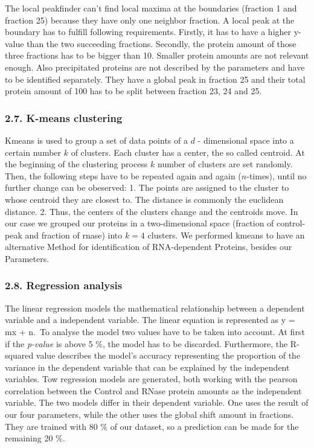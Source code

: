 \documentclass[
  12pt,
]{article}
\begin{document}
The local peakfinder can't find local maxima at the boundaries (fraction
1 and fraction 25) because they have only one neighbor fraction. A local
peak at the boundary has to fulfill following requirements. Firstly, it
has to have a higher y-value than the two succeeding fractions.
Secondly, the protein amount of those three fractions has to be bigger
than 10. Smaller protein amounts are not relevant enough. Also
precipitated proteins are not described by the parameters and have to be
identified separately. They have a global peak in fraction 25 and their
total protein amount of 100 has to be split between fraction 23, 24 and
25.

\hypertarget{k-means-clustering}{%
\subsubsection{2.7. K-means clustering}\label{k-means-clustering}}

Kmeans is used to group a set of data points of a \(d\) - dimensional
space into a certain number \(k\) of clusters. Each cluster has a
center, the so called centroid. At the beginning of the clustering
process \(k\) number of clusters are set randomly. Then, the following
steps have to be repeated again and again (\(n\)-times), until no
further change can be obeserved: 1. The points are assigned to the
cluster to whose centroid they are closest to. The distance is commonly
the euclidean distance. 2. Thus, the centers of the clusters change and
the centroids move. In our case we grouped our proteins in a
two-dimensional space (fraction of control-peak and fraction of rnase)
into \(k=4\) clusters. We performed kmeans to have an alternative Method
for identification of RNA-dependent Proteins, besides our Parameters.

\hypertarget{regression-analysis}{%
\subsubsection{2.8. Regression analysis}\label{regression-analysis}}

The linear regression models the mathematical relationship between a
dependent variable and a independent variable. The linear equation is
represented as y = mx + n.~To analyse the model two values have to be
taken into account. At first if the \emph{p-value} is above 5 \%, the
model has to be discarded. Furthermore, the R-squared value describes
the model's accuracy representing the proportion of the variance in the
dependent variable that can be explained by the independent variables.
Tow regression models are generated, both working with the pearson
correlation between the Control and RNase protein amounts as the
independent variable. The two models differ in their dependent variable.
One uses the result of our four parameters, while the other uses the
global shift amount in fractions. They are trained with 80 \% of our
dataset, so a prediction can be made for the remaining 20 \%.
\end{document}
